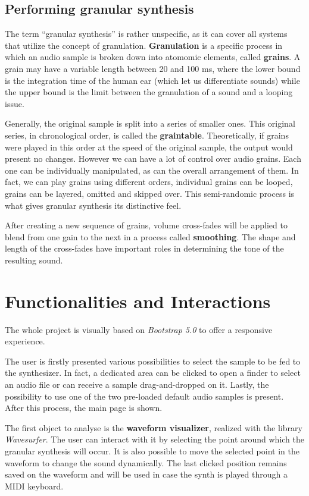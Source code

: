 \documentclass[12pt, a4paper]{article}
\newcommand{\quotes}[1]{``#1''}
\begin{document}
\subsection{Performing granular synthesis}
The term \quotes{granular synthesis} is rather unspecific, as it can cover all systems that utilize the concept of granulation. \textbf{Granulation} is a specific process in which an audio sample is broken down into atomomic elements, called \textbf{grains}.
A grain may have a variable length between 20 and 100 ms, where the lower bound is the integration time of the human ear (which let us differentiate sounds) while the upper bound is the limit between the granulation of a sound and a looping issue.

Generally, the original sample is split into a series of smaller ones. This original series, in chronological order, is called the \textbf{graintable}. Theoretically, if grains were played in this order at the speed of the original sample, the output would present no changes.
However we can have a lot of control over audio grains. Each one can be individually manipulated, as can the overall arrangement of them. \newline
In fact, we can play grains using different orders, individual grains can be looped, grains can be layered, omitted and skipped over. This semi-randomic process is what gives granular synthesis its distinctive feel.

After creating a new sequence of grains, volume cross-fades will be applied to blend from one gain to the next in a process called \textbf{smoothing}. The shape and length of the cross-fades have important roles in determining the tone of the resulting sound.

\section{Functionalities and Interactions}
The whole project is visually based on \emph{Bootstrap 5.0} to offer a responsive experience.

The user is firstly presented various possibilities to select the sample to be fed to the synthesizer. In fact, a dedicated area can be clicked to open a finder to select an audio file or can receive a sample drag-and-dropped on it. Lastly, the possibility to use one of the two pre-loaded default audio samples is present. \newline After this process, the main page is shown.

The first object to analyse is the \textbf{waveform visualizer}, realized with the library \emph{Wavesurfer}. The user can interact with it by selecting the point around which the granular synthesis will occur. It is also possible to move the selected point in the waveform to change the sound dynamically. \newline The last clicked position remains saved on the waveform and will be used in case the synth is played through a MIDI keyboard.
\end{document}

